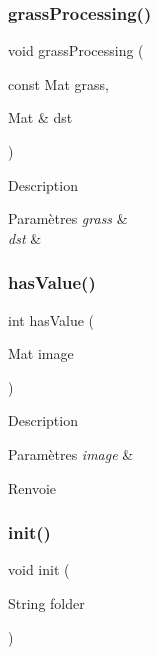 \subsubsection{\texorpdfstring{grass\+Processing()}{grassProcessing()}}
{\footnotesize\ttfamily void grass\+Processing (\begin{DoxyParamCaption}\item[{const Mat}]{grass,  }\item[{Mat \&}]{dst }\end{DoxyParamCaption})}

Description 
\begin{DoxyParams}{Paramètres}
{\em grass} & \\
\hline
{\em dst} & \\
\hline
\end{DoxyParams}
\mbox{\label{video-player_8cpp_a7d45bd8cb5867588c53db90cd9f2a384}} 
\subsubsection{\texorpdfstring{has\+Value()}{hasValue()}}
{\footnotesize\ttfamily int has\+Value (\begin{DoxyParamCaption}\item[{Mat}]{image }\end{DoxyParamCaption})}

Description 
\begin{DoxyParams}{Paramètres}
{\em image} & \\
\hline
\end{DoxyParams}
\begin{DoxyReturn}{Renvoie}

\end{DoxyReturn}
\mbox{\label{video-player_8cpp_af2babdeaf66dfac24e508efa01c230a0}} 
\subsubsection{\texorpdfstring{init()}{init()}}
{\footnotesize\ttfamily void init (\begin{DoxyParamCaption}\item[{String}]{folder }\end{DoxyParamCaption})}

